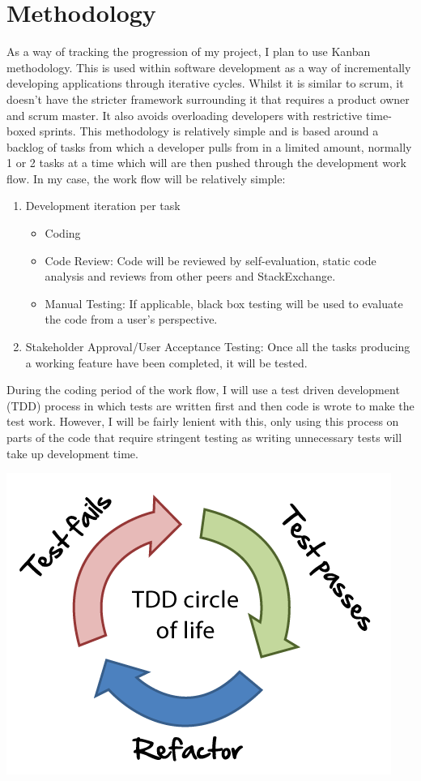 \documentclass[]{report}
\begin{document}
	\section{Methodology}
			As a way of tracking the progression of my project, I plan to use Kanban methodology. This is used within software development as a way of incrementally developing applications through iterative cycles. Whilst it is similar to scrum, it doesn't have the stricter framework surrounding it that requires a product owner and scrum master. It also avoids overloading developers with restrictive time-boxed sprints. This methodology is relatively simple and is based around a backlog of tasks from which a developer pulls from in a limited amount, normally 1 or 2 tasks at a time which will are then pushed through the development work flow. In my case, the work flow will be relatively simple:
			\begin{enumerate}
				\item Development iteration per task
				\begin{itemize}
					\item Coding
					\item Code Review: Code will be reviewed by self-evaluation, static code analysis and reviews from other peers and StackExchange.
					\item Manual Testing: If applicable, black box testing will be used to evaluate the code from a user's perspective.
				\end{itemize}
				\item Stakeholder Approval/User Acceptance Testing: Once all the tasks producing a working feature have been completed, it will be tested. 
			\end{enumerate}
		During the coding period of the work flow, I will use a test driven development (TDD) process in which tests are written first and then code is wrote to make the test work. However, I will be fairly lenient with this, only using this process on parts of the code that require stringent testing as writing unnecessary tests will take up development time. 
		\begin{center}
			\includegraphics[scale=0.5]{tdd-circle-of-life.png}
		\end{center}
\end{document}
